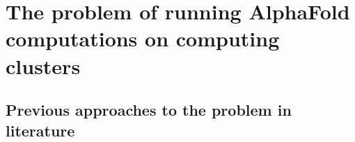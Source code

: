 \chapter{The problem of running AlphaFold computations on computing clusters}


\section{Previous approaches to the problem in literature}